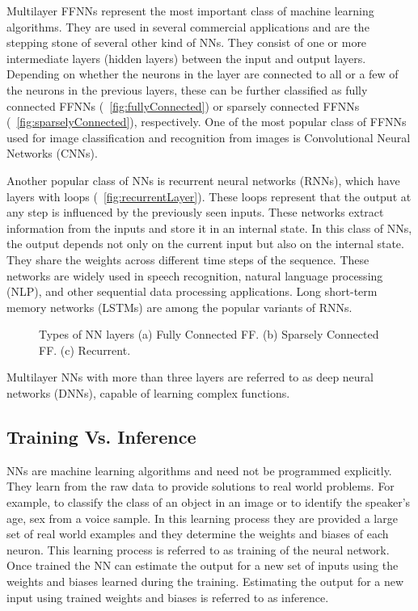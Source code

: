 Multilayer FFNNs represent the most important class of machine learning algorithms. They are used in several commercial applications and are the stepping stone of several other kind of NNs. They consist of one or more intermediate layers (hidden layers) between the input and output layers. Depending on whether the neurons in the layer are connected to all or a few of the neurons in the previous layers, these can be further classified as fully connected FFNNs (\figurename{~\ref{fig:fullyConnected}}) or sparsely connected FFNNs (\figurename{~\ref{fig:sparselyConnected}}), respectively. One of the most popular class of FFNNs used for image classification and recognition from images is Convolutional Neural Networks (CNNs).

Another popular class of NNs is recurrent neural networks (RNNs), which have layers with loops (\figurename{~\ref{fig:recurrentLayer}}). These loops represent that the output at any step is influenced by the previously seen inputs. These networks extract information from the inputs and store it in an internal state. In this class of NNs, the output depends not only on the current input but also on the internal state. They share the weights across different time steps of the sequence. These networks are widely used in speech recognition, natural language processing (NLP), and other sequential data processing applications. Long short-term memory networks (LSTMs) are among the popular variants of RNNs.

\begin{figure}[!htb]
	\centering
	\captionsetup{font=sf}
	\hfil
	\hfil
	\caption{Types of NN layers (a) Fully Connected FF. (b) Sparsely Connected FF. (c) Recurrent. }
	\label{fig:nnLayers}
\end{figure}
Multilayer NNs with more than three layers are referred to as deep neural networks (DNNs), capable of learning complex functions. 
\subsection{Training Vs. Inference}
NNs are machine learning algorithms and need not be programmed explicitly. They learn from the raw data to provide solutions to real world problems. For example, to classify the class of an object in an image or to identify the speaker's age, sex from a voice sample. In this learning process they are provided a large set of real world examples and they determine the weights and biases of each neuron. This learning process is referred to as training of the neural network. Once trained the NN can estimate the output for a new set of inputs using the weights and biases learned during the training. Estimating the output for a new input using trained weights and biases is referred to as inference.

